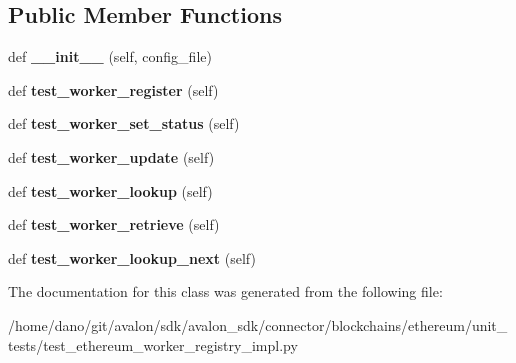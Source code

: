 \subsection*{Public Member Functions}
\begin{DoxyCompactItemize}
\item 
\mbox{\label{classtest__ethereum__worker__registry__impl_1_1TestEthereumWorkerRegistryImpl_ae84ae01a1c278dc99a341561ffa6aa98}} 
def {\bfseries \+\_\+\+\_\+init\+\_\+\+\_\+} (self, config\+\_\+file)
\item 
\mbox{\label{classtest__ethereum__worker__registry__impl_1_1TestEthereumWorkerRegistryImpl_a5eb157061abb7ca207bdb25cd326e373}} 
def {\bfseries test\+\_\+worker\+\_\+register} (self)
\item 
\mbox{\label{classtest__ethereum__worker__registry__impl_1_1TestEthereumWorkerRegistryImpl_a5a0b737f6bb164b34c8fdb9977855762}} 
def {\bfseries test\+\_\+worker\+\_\+set\+\_\+status} (self)
\item 
\mbox{\label{classtest__ethereum__worker__registry__impl_1_1TestEthereumWorkerRegistryImpl_aeb3c2a42e3e58cb74398356cc229837b}} 
def {\bfseries test\+\_\+worker\+\_\+update} (self)
\item 
\mbox{\label{classtest__ethereum__worker__registry__impl_1_1TestEthereumWorkerRegistryImpl_a92f21fb7d5e9d0e631c0d3fe7200a22a}} 
def {\bfseries test\+\_\+worker\+\_\+lookup} (self)
\item 
\mbox{\label{classtest__ethereum__worker__registry__impl_1_1TestEthereumWorkerRegistryImpl_aabe47f4c7bba6044a3a0d38846be47f6}} 
def {\bfseries test\+\_\+worker\+\_\+retrieve} (self)
\item 
\mbox{\label{classtest__ethereum__worker__registry__impl_1_1TestEthereumWorkerRegistryImpl_a73711319c93a2081911ceb8dfdbfdb87}} 
def {\bfseries test\+\_\+worker\+\_\+lookup\+\_\+next} (self)
\end{DoxyCompactItemize}


The documentation for this class was generated from the following file\+:\begin{DoxyCompactItemize}
\item 
/home/dano/git/avalon/sdk/avalon\+\_\+sdk/connector/blockchains/ethereum/unit\+\_\+tests/test\+\_\+ethereum\+\_\+worker\+\_\+registry\+\_\+impl.\+py\end{DoxyCompactItemize}
